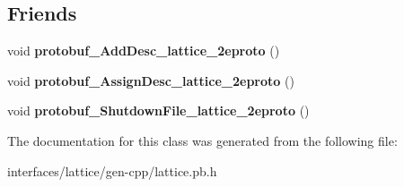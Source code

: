 \subsection*{Friends}
\begin{DoxyCompactItemize}
\item 
\hypertarget{classlattice_1_1Phraselet_a19e63fb37025879e023cad88064187cf}{
void {\bfseries protobuf\_\-AddDesc\_\-lattice\_\-2eproto} ()}
\label{classlattice_1_1Phraselet_a19e63fb37025879e023cad88064187cf}

\item 
\hypertarget{classlattice_1_1Phraselet_a3b0386e09a9fefcf1bdce658cfc480b2}{
void {\bfseries protobuf\_\-AssignDesc\_\-lattice\_\-2eproto} ()}
\label{classlattice_1_1Phraselet_a3b0386e09a9fefcf1bdce658cfc480b2}

\item 
\hypertarget{classlattice_1_1Phraselet_a3c7b187721d0704ceb19ff889729d35a}{
void {\bfseries protobuf\_\-ShutdownFile\_\-lattice\_\-2eproto} ()}
\label{classlattice_1_1Phraselet_a3c7b187721d0704ceb19ff889729d35a}

\end{DoxyCompactItemize}


The documentation for this class was generated from the following file:\begin{DoxyCompactItemize}
\item 
interfaces/lattice/gen-\/cpp/lattice.pb.h\end{DoxyCompactItemize}
